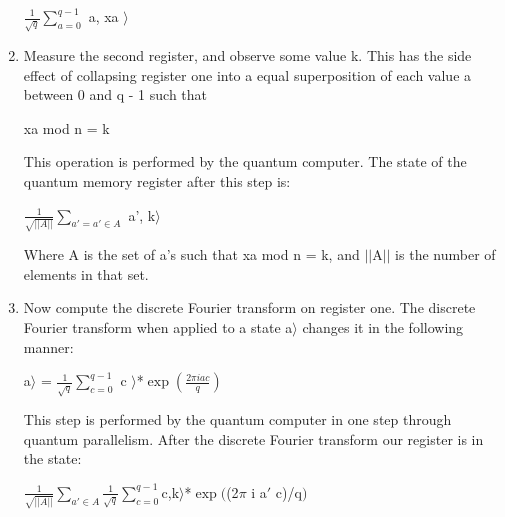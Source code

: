 \documentclass{article}
\begin{document}
\begin{enumerate}
    \begin{center}
    $\displaystyle {\frac{{1}}{{\sqrt{q}}}}$$\displaystyle \sum_{{a = 0}}^{{q - 1}}$ \vert a, xa $\displaystyle \rangle$
    \end{center}

    \item
    Measure the second register, and observe some value k. This has the side effect of collapsing register one into a equal superposition of each value a between 0 and q - 1 such that

    \begin{center}
    xa mod n = k
    \end{center}

    This operation is performed by the quantum computer. The state of the quantum memory register after this step is:

    \begin{center}
    $\displaystyle {\frac{{1}}{{\sqrt{\vert\vert A\vert\vert}}}}$$\displaystyle \sum_{{a'=a'\in A}}^{}$ \vert a', k$\displaystyle \rangle$
    \end{center}

    Where A is the set of a's such that xa mod n = k, and $||$A$||$ is the number of elements in that set.

    \item
    Now compute the discrete Fourier transform on register one. The discrete Fourier transform when applied to a state \vert a$ \rangle$ changes it in the following manner:

    \begin{center}
        \vert a$\displaystyle \rangle$ = $\displaystyle {\frac{{1}}{{\sqrt{q}}}}$$\displaystyle \sum_{{c=0}}^{{q-1}}$ \vert c $\displaystyle \rangle$*$\exp(\frac{2\pi i a c}{q})$
    \end{center}

    This step is performed by the quantum computer in one step through quantum parallelism. After the discrete Fourier transform our register is in the state:

    \begin{center}
    
        $\displaystyle {\frac{{1}}{{\sqrt{\vert\vert A\vert\vert}}}}$$\displaystyle \sum_{{a'\in A}}^{}$$\displaystyle {\frac{{1}}{{\sqrt{q}}}}$$\displaystyle \sum_{{c=0}}^{{q-1}}$\vert c,k$\displaystyle \rangle$*$\exp(${(2$\pi$ i a$'$ c)}/{q}$)$
    
    \end{center}


\end{enumerate}
\end{document}
